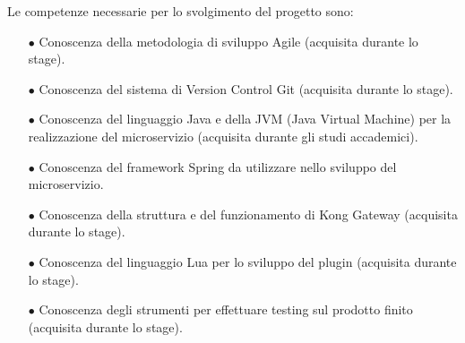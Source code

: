 Le competenze necessarie per lo svolgimento del progetto sono:
\begin{itemize}
	\item[$\bullet$]Conoscenza della metodologia di sviluppo Agile (acquisita durante lo stage).
	\item[$\bullet$]Conoscenza del sistema di Version Control Git (acquisita durante lo stage).
	\item[$\bullet$]Conoscenza del linguaggio Java e della JVM (Java Virtual Machine) per la realizzazione del microservizio (acquisita durante gli studi accademici).
	\item[$\bullet$]Conoscenza del framework Spring da utilizzare nello sviluppo del microservizio.
	\item[$\bullet$]Conoscenza della struttura e del funzionamento di Kong Gateway (acquisita durante lo stage).
	\item[$\bullet$]Conoscenza del linguaggio Lua per lo sviluppo del plugin (acquisita durante lo stage).
	\item[$\bullet$]Conoscenza degli strumenti per effettuare testing sul prodotto finito (acquisita durante lo stage).
\end{itemize}


